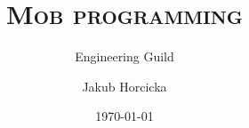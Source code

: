 \documentclass[xcolor=dvipsnames]{beamer}
\author{Jakub Horcicka}
\title{\textsc{Mob programming}}
\subtitle{Engineering Guild}
\date{\today}
\begin{document}
 
  \begin{frame}
    \titlepage
  \end{frame}

  
  
\end{document}
